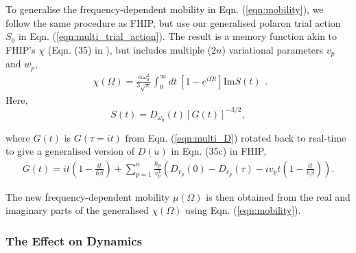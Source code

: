 To generalise the frequency-dependent mobility in Eqn. (\ref{eqn:mobility}), we follow the same procedure as FHIP, but use our generalised polaron trial action $S_0$ in Eqn. (\ref{eqn:multi_trial_action}). The result is a memory function akin to FHIP's $\chi$ (Eqn. (35) in \cite{Feynman1962}), but includes multiple ($2n$) variational parameters $v_{p}$ and $w_{p}$,
\begin{equation}\label{eqn:multichi}
    \begin{gathered}
        \chi(\Omega) = \frac{\alpha \omega_0^{2}}{3\sqrt{\pi}} \int_0^{\infty} dt\ \left[1 - e^{i\Omega t}\right] \textrm{Im} S(t)
    \end{gathered} .
\end{equation}
Here, 
\begin{equation}
    S(t) = D_{\omega_0}(t) [G(t)]^{-3/2} ,
\end{equation}

where $G(t)$ is $G(\tau = i t)$ from Eqn. (\ref{eqn:multi_D}) rotated back to real-time to give a generalised version of $D(u)$ in Eqn. (35c) in FHIP,
\begin{equation}
    \begin{gathered}
         G(t) = i t  \left(1 - \frac{i t}{\hbar\beta}\right) + \sum_{p=1}^n \frac{h_p}{v_p^3} \left(D_{v_p}(0) - D_{v_p}(\tau) - iv_p t\left(1 - \frac{it}{\hbar\beta} \right) \right).
    \end{gathered}
\end{equation}

The new frequency-dependent mobility $\mu(\Omega)$ is then obtained from the real and imaginary parts of the generalised $\chi(\Omega)$ using Eqn. (\ref{eqn:mobility}).

\subsubsection{The Effect on Dynamics}

